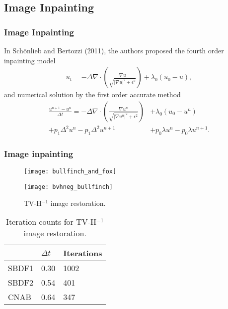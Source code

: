 \documentclass[hyperref={pdfpagelabels=false}]{beamer}
\begin{document}
\subsection{Image Inpainting} 
\begin{frame}
	\frametitle{Image Inpainting} 
	In Sch\"{o}nlieb and Bertozzi (2011), the authors proposed the fourth order inpainting model 
	\begin{align*}
	u_t = -\Delta \nabla \cdot\left( \frac{\nabla u}{\sqrt{\left\vert \nabla u \right\vert^2 + \epsilon^2}} \right) + \lambda_0 (u_0 - u),
	\end{align*}
	and numerical solution by the first order accurate method 
	\begin{align*}
	\frac{u^{n+1} - u^n}{\Delta t} 
	=  -\Delta \nabla \cdot\left( \frac{\nabla u^n}{\sqrt{\left\vert \nabla u^n \right\vert^2 + \epsilon^2}} \right) &+ \lambda_0 (u_0 - u^n) 
\\ +p_1\Delta^2u^n - p_1\Delta^2 u^{n+1} 
	&+ p_0\lambda u^n  - p_0\lambda u^{n+1}.
	\end{align*}
\end{frame}
\begin{frame}
	\frametitle{Image inpainting} 
	\begin{figure}
		\centering
\begin{minipage}{0.45\textwidth}
\centering
	\texttt{[image: bullfinch\_and\_fox]}
\end{minipage}
\begin{minipage}{0.45\textwidth}
\centering
        \texttt{[image: bvhneg\_bullfinch]}
\end{minipage}
\caption{TV-H$^{-1}$ image restoration.} 
	\end{figure}
\vspace{-15pt}
	\begin{table}[b]
		\centering 
	\caption{Iteration counts for TV-H$^{-1}$ image restoration.}
		\begin{tabular}{lll}
			\toprule 
			& $\Delta t$ & Iterations 
			\\ \midrule 
		SBDF1 & 0.30 & 1002 
		\\ 
		SBDF2 & 0.54 & 401 
		\\ 
		CNAB & 0.64 & 347
		\\ \bottomrule
		\end{tabular}
	\end{table} 
\end{frame}
\end{document}
